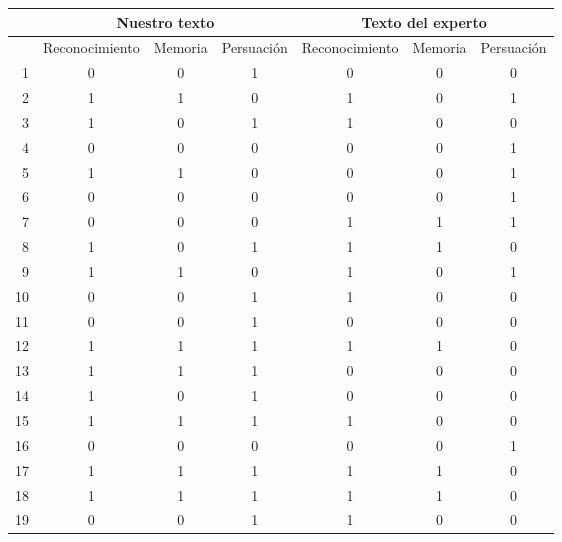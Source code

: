 \begin{table}
  \centering
  \tiny
  \begin{tabular}{|r|c|c|c|c|c|c|}
   & \multicolumn{3}{c|}{Nuestro texto}     & \multicolumn{3}{c|}{Texto del experto}   \\\hline
   & Reconocimiento & Memoria & Persuación & Reconocimiento & Memoria & Persuación \\\hline \hline

1 &         0 &         0 &         1 &         0 &         0 &         0 \\
2 &         1 &         1 &         0 &         1 &         0 &         1 \\
3 &         1 &         0 &         1 &         1 &         0 &         0 \\
4 &         0 &         0 &         0 &         0 &         0 &         1 \\
5 &         1 &         1 &         0 &         0 &         0 &         1 \\
6 &         0 &         0 &         0 &         0 &         0 &         1 \\
7 &         0 &         0 &         0 &         1 &         1 &         1 \\
8 &         1 &         0 &         1 &         1 &         1 &         0 \\
9 &         1 &         1 &         0 &         1 &         0 &         1 \\
10 &         0 &         0 &         1 &         1 &         0 &         0 \\
11 &         0 &         0 &         1 &         0 &         0 &         0 \\
12 &         1 &         1 &         1 &         1 &         1 &         0 \\
13 &         1 &         1 &         1 &         0 &         0 &         0 \\
14 &         1 &         0 &         1 &         0 &         0 &         0 \\
15 &         1 &         1 &         1 &         1 &         0 &         0 \\
16 &         0 &         0 &         0 &         0 &         0 &         1 \\
17 &         1 &         1 &         1 &         1 &         1 &         0 \\
18 &         1 &         1 &         1 &         1 &         1 &         0 \\
19 &         0 &         0 &         1 &         1 &         0 &         0 \\

\end{tabular}
\end{table}
